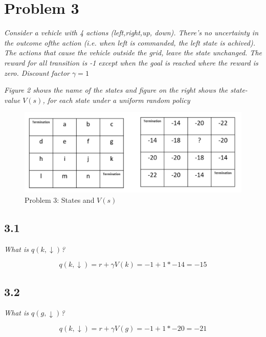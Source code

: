 \documentclass{article}
\begin{document}
\section*{Problem 3}

\textit{Consider a vehicle with 4 actions (left,right,up, down). There’s no uncertainty in the outcome ofthe action (i.e. when left is commanded, the left state is achived). The actions that cause the vehicle outside the grid, leave the state unchanged. The reward for all transition is -1 except when the goal is reached where the reward is zero. Discount factor $\gamma = 1$}

\textit{Figure 2 shows the name of the states and figure on the right shows the state-value $V(s)$, for each state under a uniform random policy}

\begin{figure}
    \centering
    \includegraphics[width=.8\linewidth]{imgs/midterm.3.png}
    \caption{Problem 3: States and $V(s)$}
\end{figure}

\subsection*{3.1}

\textit{What is $q(k, \downarrow)$?}

\begin{equation}
    q(k, \downarrow) = r + \gamma V(k) = -1 + 1 * -14 = -15
\end{equation}



\subsection*{3.2}

\textit{What is $q(g, \downarrow)$?}

\begin{equation}
    q(k, \downarrow) = r + \gamma V(g) = -1 + 1 * -20 = -21
\end{equation}
\end{document}
